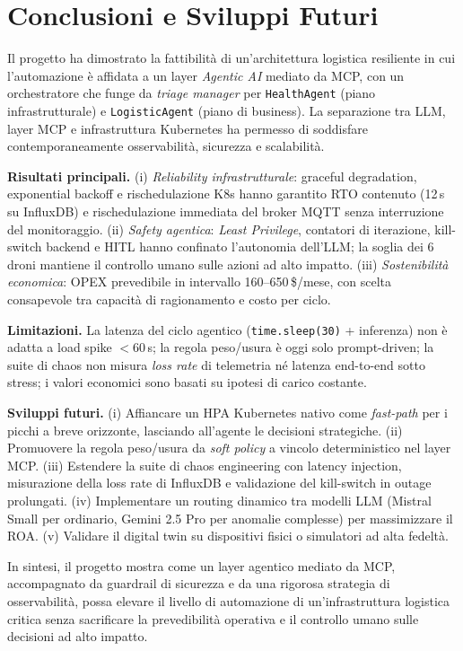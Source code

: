 
\chapter{Conclusioni e Sviluppi Futuri}
\label{cap:conclusioni}

Il progetto ha dimostrato la fattibilità di un'architettura logistica resiliente in cui l'automazione è affidata a un layer \textit{Agentic AI} mediato da MCP, con un orchestratore che funge da \textit{triage manager} per \texttt{HealthAgent} (piano infrastrutturale) e \texttt{LogisticAgent} (piano di business). La separazione tra LLM, layer MCP e infrastruttura Kubernetes ha permesso di soddisfare contemporaneamente osservabilità, sicurezza e scalabilità.

\textbf{Risultati principali.} (i) \textit{Reliability infrastrutturale}: graceful degradation, exponential backoff e rischedulazione K8s hanno garantito RTO contenuto (12\,s su InfluxDB) e rischedulazione immediata del broker MQTT senza interruzione del monitoraggio. (ii) \textit{Safety agentica}: \textit{Least Privilege}, contatori di iterazione, kill-switch backend e HITL hanno confinato l'autonomia dell'LLM; la soglia dei 6 droni mantiene il controllo umano sulle azioni ad alto impatto. (iii) \textit{Sostenibilità economica}: OPEX prevedibile in intervallo 160--650\,\$/mese, con scelta consapevole tra capacità di ragionamento e costo per ciclo.

\textbf{Limitazioni.} La latenza del ciclo agentico (\texttt{time.sleep(30)} + inferenza) non è adatta a load spike $<60$\,s; la regola peso/usura è oggi solo prompt-driven; la suite di chaos non misura \textit{loss rate} di telemetria né latenza end-to-end sotto stress; i valori economici sono basati su ipotesi di carico costante.

\textbf{Sviluppi futuri.} (i) Affiancare un HPA Kubernetes nativo come \emph{fast-path} per i picchi a breve orizzonte, lasciando all'agente le decisioni strategiche. (ii) Promuovere la regola peso/usura da \textit{soft policy} a vincolo deterministico nel layer MCP. (iii) Estendere la suite di chaos engineering con latency injection, misurazione della loss rate di InfluxDB e validazione del kill-switch in outage prolungati. (iv) Implementare un routing dinamico tra modelli LLM (Mistral Small per ordinario, Gemini 2.5 Pro per anomalie complesse) per massimizzare il ROA. (v) Validare il digital twin su dispositivi fisici o simulatori ad alta fedeltà.

In sintesi, il progetto mostra come un layer agentico mediato da MCP, accompagnato da guardrail di sicurezza e da una rigorosa strategia di osservabilità, possa elevare il livello di automazione di un'infrastruttura logistica critica senza sacrificare la prevedibilità operativa e il controllo umano sulle decisioni ad alto impatto.
